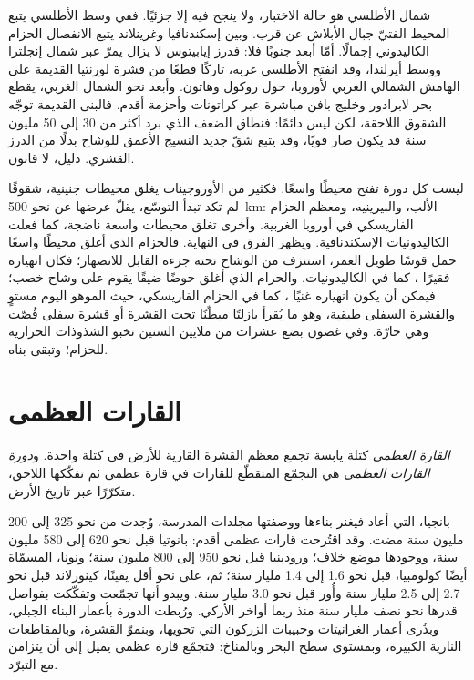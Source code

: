 شمال الأطلسي هو حالة الاختبار، ولا ينجح فيه إلا جزئيًا. ففي وسط الأطلسي
يتبع المحيط الفتيّ جبال الأبلاش عن قرب. وبين إسكندنافيا وغرينلاند يتبع الانفصال
الحزام الكاليدوني إجمالًا. أمّا أبعد جنوبًا فلا: فدرز إيابيتوس لا يزال يمرّ
عبر شمال إنجلترا ووسط أيرلندا، وقد انفتح الأطلسي غربه، تاركًا
قطعًا من قشرة لورنتيا القديمة على الهامش الشمالي الغربي لأوروبا، حول روكول وهاتون.
وأبعد نحو الشمال الغربي، يقطع بحر لابرادور وخليج بافن مباشرة عبر كراتونات
وأحزمة أقدم. فالبنى القديمة توجّه الشقوق اللاحقة، لكن ليس دائمًا: فنطاق الضعف الذي برد أكثر
من 30 إلى 50 مليون سنة قد يكون صار قويًا، وقد يتبع شقّ جديد النسيج الأعمق
للوشاح بدلًا من الدرز القشري.  دليل، لا قانون.

ليست كل دورة تفتح محيطًا واسعًا. فكثير من الأوروجينات يغلق محيطات جنينية، شقوقًا لم
تكد تبدأ التوسّع، يقلّ عرضها عن نحو \qty{500}{km}: الألب، والبيرينيه، ومعظم
الحزام الفاريسكي في أوروبا الغربية. وأخرى تغلق محيطات واسعة ناضجة، كما فعلت
الكاليدونيات الإسكندنافية. ويظهر الفرق في النهاية. فالحزام الذي أغلق محيطًا واسعًا حمل
قوسًا طويل العمر، استنزف من الوشاح تحته جزءه القابل للانصهار؛ فكان انهياره فقيرًا
، كما في الكاليدونيات. والحزام الذي أغلق حوضًا ضيقًا يقوم على وشاح خصب؛ فيمكن أن يكون
انهياره غنيًا ، كما في الحزام الفاريسكي، حيث الموهو اليوم مستوٍ
والقشرة السفلى طبقية، وهو ما يُقرأ بازلتًا مبطّنًا تحت القشرة أو قشرة سفلى قُصّت
وهي حارّة. وفي غضون بضع عشرات من ملايين السنين تخبو الشذوذات
الحرارية للحزام؛ وتبقى بناه.

\section{القارات العظمى}\label{sec:b2:wilson-cycle:supercontinents}

\begin{definition}\label{def:b2:wilson-cycle:supercontinent}
\emph{القارة العظمى} كتلة يابسة تجمع معظم القشرة القارية
للأرض في كتلة واحدة. و\emph{دورة القارات العظمى} هي التجمّع
المتقطّع للقارات في قارة عظمى ثم تفكّكها
اللاحق، متكرّرًا عبر تاريخ الأرض.
\end{definition}

بانجيا، التي أعاد فيغنر بناءها ووصفتها مجلدات المدرسة، وُجدت من نحو 325
إلى 200 مليون سنة مضت. وقد اقتُرحت قارات عظمى أقدم: بانوتيا قبل نحو 620 إلى
580 مليون سنة، ووجودها موضع خلاف؛ ورودينيا قبل نحو 950 إلى 800 مليون سنة؛
ونونا، المسمّاة أيضًا كولومبيا، قبل نحو 1.6 إلى 1.4 مليار سنة؛ ثم، على نحو أقل يقينًا، كينورلاند
قبل نحو 2.7 إلى 2.5 مليار سنة وأُور قبل نحو 3.0 مليار سنة. ويبدو أنها
تجمّعت وتفكّكت بفواصل قدرها نحو نصف مليار سنة منذ ربما أواخر
الأركي. ورُبطت الدورة بأعمار البناء الجبلي، وبذُرى أعمار
الغرانيتات وحبيبات الزركون التي تحويها، وبنموّ القشرة، وبالمقاطعات النارية
الكبيرة، وبمستوى سطح البحر وبالمناخ: فتجمّع قارة عظمى يميل إلى أن يتزامن
مع التبرّد.

